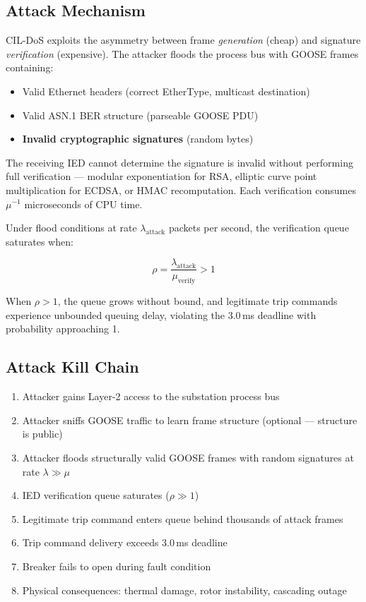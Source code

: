 \documentclass[11pt,a4paper]{article}
\begin{document}
\subsection{Attack Mechanism}

CIL-DoS exploits the asymmetry between frame \emph{generation} (cheap) and signature \emph{verification} (expensive). The attacker floods the process bus with GOOSE frames containing:

\begin{itemize}[leftmargin=2em]
    \item Valid Ethernet headers (correct EtherType, multicast destination)
    \item Valid ASN.1 BER structure (parseable GOOSE PDU)
    \item \textbf{Invalid cryptographic signatures} (random bytes)
\end{itemize}

The receiving IED cannot determine the signature is invalid without performing full verification --- modular exponentiation for RSA, elliptic curve point multiplication for ECDSA, or HMAC recomputation. Each verification consumes $\mu^{-1}$ microseconds of CPU time.

Under flood conditions at rate $\lambda_{\text{attack}}$ packets per second, the verification queue saturates when:

\begin{equation}
\rho = \frac{\lambda_{\text{attack}}}{\mu_{\text{verify}}} > 1
\label{eq:saturation}
\end{equation}

When $\rho > 1$, the queue grows without bound, and legitimate trip commands experience unbounded queuing delay, violating the 3.0\,ms deadline with probability approaching 1.

\subsection{Attack Kill Chain}

\begin{enumerate}[leftmargin=2em]
    \item Attacker gains Layer-2 access to the substation process bus
    \item Attacker sniffs GOOSE traffic to learn frame structure (optional --- structure is public)
    \item Attacker floods structurally valid GOOSE frames with random signatures at rate $\lambda \gg \mu$
    \item IED verification queue saturates ($\rho \gg 1$)
    \item Legitimate trip command enters queue behind thousands of attack frames
    \item Trip command delivery exceeds 3.0\,ms deadline
    \item Breaker fails to open during fault condition
    \item Physical consequences: thermal damage, rotor instability, cascading outage
\end{enumerate}
\end{document}
